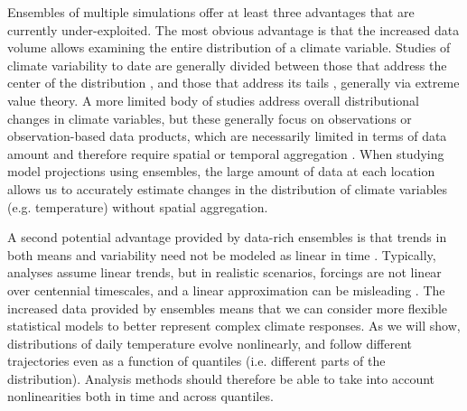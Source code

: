 \documentclass{ametsoc}
\begin{document}
Ensembles of multiple simulations offer at least three advantages that are currently under-exploited. The most obvious advantage is that the increased data volume allows examining the entire distribution of a climate variable.
 Studies of climate variability to date are generally divided between those that address the center of the distribution 
\citep[e.g.][]{semenov2002secular,raisanen2002co2, kitoh2009changes, screen2014arctic, schneider2015physics}, and those that address its tails \citep[e.g.][]{katz1992extreme, meehl2009relative, northrop2011threshold, davison2012statistical, huser2014space, trenberth2015attribution, huang2015estimating, jalbert2017spatiotemporal}, generally via extreme value theory. %
A more limited body of studies address overall distributional changes in climate variables, but these generally focus on observations or observation-based data products, which are necessarily limited in terms of data amount and therefore require spatial or temporal aggregation \citep{donat2012shifting, stainforth2013mapping, chapman2013estimating, huybers2014us, mckinnon2016changing, rhines2017seasonally}. 
When studying model projections using ensembles, the large amount of data at each location allows us to accurately estimate changes in the distribution of climate variables (e.g. temperature) without spatial aggregation.

A second potential advantage provided by data-rich ensembles is that trends in both means and variability need not be modeled as linear in time \citep{franzke2015local,gao2017quantile}. Typically, analyses assume linear trends,  
but in realistic scenarios, forcings are not linear over centennial timescales, and a linear approximation can be misleading \citep[see for example][]{poppick2017estimating}. The increased data provided by ensembles means that we can consider more flexible statistical models to better represent complex climate responses. %
As we will show, distributions of daily temperature evolve nonlinearly, and follow different trajectories even as a function of quantiles (i.e. different parts of the distribution). %
Analysis methods should therefore be able to take into account nonlinearities both in time and across quantiles. 
\end{document}
